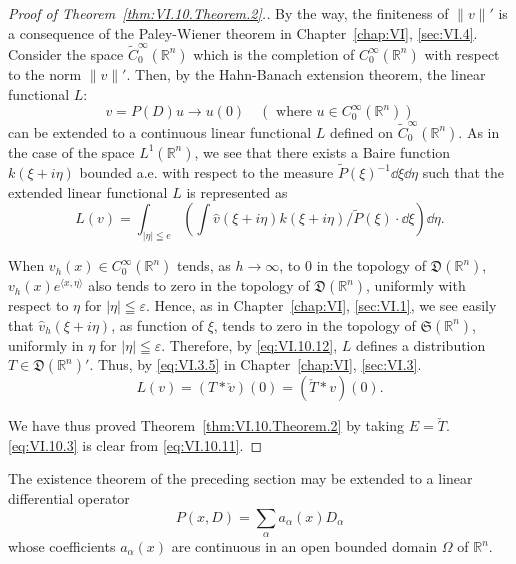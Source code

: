 \begin{proof}[Proof of Theorem~\ref{thm:VI.10.Theorem.2}.]
By the way, the finiteness of $\|v\|'$ is a consequence of the Paley-Wiener theorem in Chapter~\ref{chap:VI}, \ref{sec:VI.4}. Consider the space $\tilde{C}_{0}^{\infty}(\mathbb{R}^{n})$ which is the completion of $C_{0}^{\infty}(\mathbb{R}^{n})$ with respect to the norm $\|v\|'$. Then, by the Hahn-Banach extension theorem, the linear functional $L$: 
\[
v = P (D) u \rightarrow u (0) \quad (\text{ where } u \in C _{0} ^{\infty} (\mathbb{R}^{n}))
\]
can be extended to a continuous linear functional $L$ defined on $\tilde{C}_{0}^{\infty}(\mathbb{R}^{n})$. As in the case of the space $L^{1}(\mathbb{R}^{n})$, we see that there exists a Baire function $k(\xi + i\eta)$ bounded a.e. with respect to the measure $\tilde{P}(\xi)^{-1}\dd\xi \dd\eta$ such that the extended linear functional $L$ is represented as 
\begin{equation}\label{eq:VI.10.12}
L (v) = \int_{| \eta | \leqq e} (\int \hat {v} (\xi + i \eta) k (\xi + i \eta) / \tilde {P} (\xi) \cdot \dd \xi) \dd \eta .
\end{equation}

When $v_{h}(x) \in C_0^\infty(\mathbb{R}^{n})$ tends, as $h \to \infty$, to $0$ in the topology of $\mathfrak{D}(\mathbb{R}^{n})$, $v_{h}(x)e^{\langle x,\eta\rangle}$ also tends to zero in the topology of $\mathfrak{D}(\mathbb{R}^{n})$, uniformly with respect to $\eta$ for $|\eta| \leqq \varepsilon$. Hence, as in Chapter~\ref{chap:VI}, \ref{sec:VI.1}, we see easily that $\hat{v}_{h}(\xi + i\eta)$, as function of $\xi$, tends to zero in the topology of $\mathfrak{S}(\mathbb{R}^{n})$, uniformly in $\eta$ for $|\eta| \leqq \varepsilon$. Therefore, by \eqref{eq:VI.10.12}, $L$ defines a distribution $T \in \mathfrak{D}(\mathbb{R}^{n})'$. Thus, by \eqref{eq:VI.3.5} in Chapter~\ref{chap:VI}, \ref{sec:VI.3}. 
\begin{equation}\label{eq:VI.10.13}
L (v) = (T * \check {v}) (0) = (\check {T} * v) (0).
\end{equation}

We have thus proved Theorem~\ref{thm:VI.10.Theorem.2} by taking $E = \check{T}$. \eqref{eq:VI.10.3} is clear from \eqref{eq:VI.10.11}. 
\end{proof}


\label{sec:VI.11}

The existence theorem of the preceding section may be extended to a linear differential operator 
\begin{equation}\label{eq:VI.11.1}
P (x, D) = \sum\limits_{\alpha} a _{\alpha} (x) D _{\alpha}
\end{equation}
whose coefficients $a_{\alpha}(x)$ are continuous in an open bounded domain $\Omega$ of $\mathbb{R}^{n}$. 

